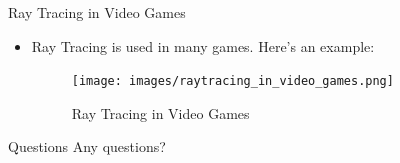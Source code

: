 \documentclass{beamer}
\begin{document}
  \begin{frame}{Ray Tracing in Video Games}
    \begin{itemize}
      \item Ray Tracing is used in many games.
      Here's an example:
      \begin{figure}
        \centering
        \texttt{[image: images/raytracing\_in\_video\_games.png]}
        \caption{Ray Tracing in Video Games}
      \end{figure}
      \end{itemize}
    \end{frame}

  \begin{frame}{Questions}
    Any questions?
  \end{frame}
\end{document}

